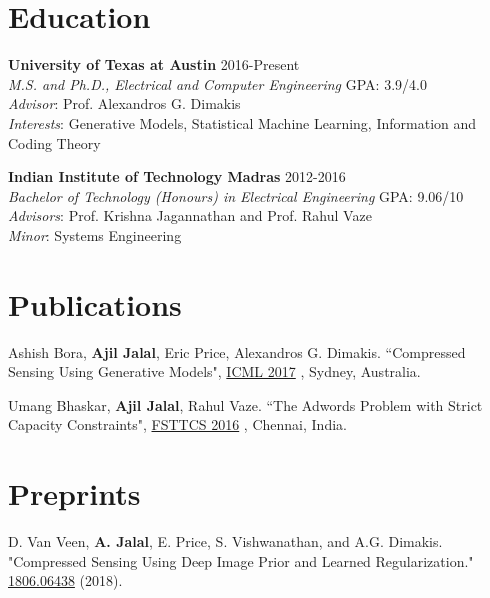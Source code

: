 \documentclass[margin, 11pt]{res} %
\begin{document}
\vspace*{-13pt}
\begin{resume}

 
\section{\large Education}
{\bf University of Texas at Austin} \hfill 2016-Present\\
{\sl M.S. and Ph.D., Electrical and Computer Engineering} \hfill GPA: 3.9/4.0 \\
{\sl Advisor}: Prof. Alexandros G. Dimakis \\
{\sl Interests}: Generative Models, Statistical Machine Learning, Information and Coding Theory

{\bf Indian Institute of Technology Madras} \hfill 2012-2016\\
{\sl Bachelor of Technology (Honours) in Electrical Engineering} \hfill GPA: 9.06/10 \\
{\sl Advisors}: Prof. Krishna Jagannathan and Prof. Rahul Vaze \\
{\sl Minor}: Systems Engineering 

\section{\large Publications} 
Ashish Bora, {\bf Ajil Jalal}, Eric Price, Alexandros G. Dimakis. ``Compressed Sensing Using Generative Models", \href{http://proceedings.mlr.press/v70/bora17a/bora17a.pdf}{ICML 2017} , Sydney, Australia.

Umang Bhaskar, {\bf Ajil Jalal}, Rahul Vaze. ``The Adwords Problem with Strict Capacity Constraints", \href{http://drops.dagstuhl.de/opus/volltexte/2016/6907/pdf/lipics-vol65-fsttcs2016-complete.pdf#page=365}{FSTTCS 2016} , Chennai, India.

\section{\large Preprints}
D. Van Veen, {\bf A. Jalal}, E. Price, S. Vishwanathan, and A.G. Dimakis. "Compressed Sensing Using Deep Image Prior and Learned Regularization." \href{https://arxiv.org/abs/1806.06438}{1806.06438} (2018).


\end{resume}
\end{document}
